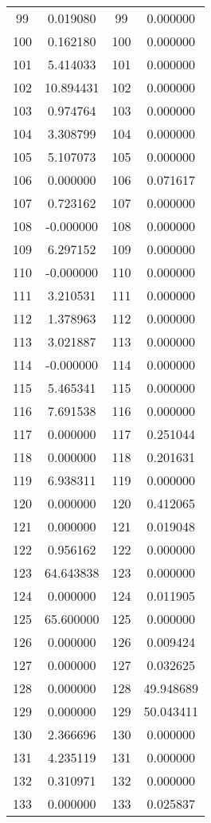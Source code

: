 \documentclass[12pt]{article}
\begin{document}
\begin{longtable}{@{}cccc@{}}
99 & 0.019080 & 99 & 0.000000 \\
100 & 0.162180 & 100 & 0.000000 \\
101 & 5.414033 & 101 & 0.000000 \\
102 & 10.894431 & 102 & 0.000000 \\
103 & 0.974764 & 103 & 0.000000 \\
104 & 3.308799 & 104 & 0.000000 \\
105 & 5.107073 & 105 & 0.000000 \\
106 & 0.000000 & 106 & 0.071617 \\
107 & 0.723162 & 107 & 0.000000 \\
108 & -0.000000 & 108 & 0.000000 \\
109 & 6.297152 & 109 & 0.000000 \\
110 & -0.000000 & 110 & 0.000000 \\
111 & 3.210531 & 111 & 0.000000 \\
112 & 1.378963 & 112 & 0.000000 \\
113 & 3.021887 & 113 & 0.000000 \\
114 & -0.000000 & 114 & 0.000000 \\
115 & 5.465341 & 115 & 0.000000 \\
116 & 7.691538 & 116 & 0.000000 \\
117 & 0.000000 & 117 & 0.251044 \\
118 & 0.000000 & 118 & 0.201631 \\
119 & 6.938311 & 119 & 0.000000 \\
120 & 0.000000 & 120 & 0.412065 \\
121 & 0.000000 & 121 & 0.019048 \\
122 & 0.956162 & 122 & 0.000000 \\
123 & 64.643838 & 123 & 0.000000 \\
124 & 0.000000 & 124 & 0.011905 \\
125 & 65.600000 & 125 & 0.000000 \\
126 & 0.000000 & 126 & 0.009424 \\
127 & 0.000000 & 127 & 0.032625 \\
128 & 0.000000 & 128 & 49.948689 \\
129 & 0.000000 & 129 & 50.043411 \\
130 & 2.366696 & 130 & 0.000000 \\
131 & 4.235119 & 131 & 0.000000 \\
132 & 0.310971 & 132 & 0.000000 \\
133 & 0.000000 & 133 & 0.025837 \\

\end{longtable}
\end{document}
